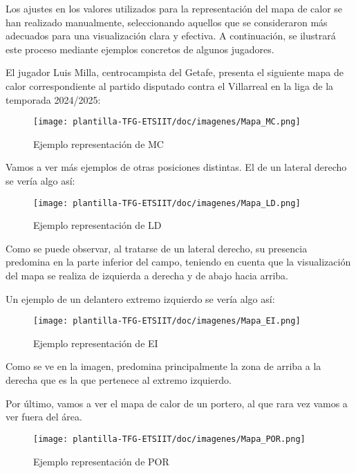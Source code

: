 Los ajustes en los valores utilizados para la representación del mapa de calor se han realizado manualmente, seleccionando aquellos que se consideraron más adecuados para una visualización clara y efectiva. A continuación, se ilustrará este proceso mediante ejemplos concretos de algunos jugadores.

El jugador Luis Milla, centrocampista del Getafe, presenta el siguiente mapa de calor correspondiente al partido disputado contra el Villarreal en la liga de la temporada 2024/2025:

\begin{figure}[H]
    \centering
    \texttt{[image: plantilla-TFG-ETSIIT/doc/imagenes/Mapa\_MC.png]}
    \caption{Ejemplo representación de MC}
    \label{fig:etiqueta-imagen}
\end{figure}

Vamos a ver más ejemplos de otras posiciones distintas. El de un lateral derecho se vería algo así:

\begin{figure}[H]
    \centering
    \texttt{[image: plantilla-TFG-ETSIIT/doc/imagenes/Mapa\_LD.png]}
    \caption{Ejemplo representación de LD}
    \label{fig:etiqueta-imagen}
\end{figure}

Como se puede observar, al tratarse de un lateral derecho, su presencia predomina en la parte inferior del campo, teniendo en cuenta que la visualización del mapa se realiza de izquierda a derecha y de abajo hacia arriba.

Un ejemplo de un delantero extremo izquierdo se vería algo así:

\begin{figure}[H]
    \centering
    \texttt{[image: plantilla-TFG-ETSIIT/doc/imagenes/Mapa\_EI.png]}
    \caption{Ejemplo representación de EI}
    \label{fig:etiqueta-imagen}
\end{figure}

Como se ve en la imagen, predomina principalmente la zona de arriba a la derecha que es la que pertenece al extremo izquierdo.

Por último, vamos a ver el mapa de calor de un portero, al que rara vez vamos a ver fuera del área.

\begin{figure}[H]
    \centering
    \texttt{[image: plantilla-TFG-ETSIIT/doc/imagenes/Mapa\_POR.png]}
    \caption{Ejemplo representación de POR}
    \label{fig:etiqueta-imagen}
\end{figure}

